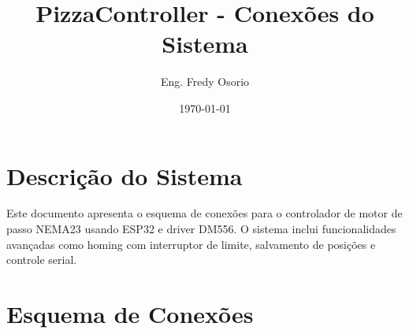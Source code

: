 \documentclass{article}
\title{PizzaController - Conexões do Sistema}
\author{Eng. Fredy Osorio}
\date{\today}
\begin{document}
\maketitle

\section{Descrição do Sistema}
Este documento apresenta o esquema de conexões para o controlador de motor de passo NEMA23 usando ESP32 e driver DM556. O sistema inclui funcionalidades avançadas como homing com interruptor de limite, salvamento de posições e controle serial.

\section{Esquema de Conexões}
\end{document}
